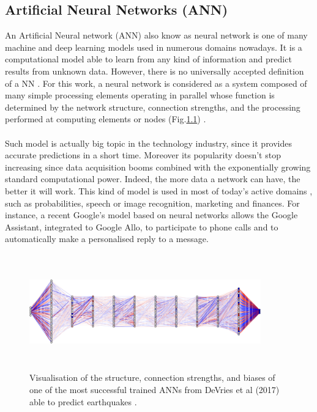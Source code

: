 \documentclass[11pt, a4paper, English]{report}
\begin{document}
\begin{appendix}
\color{blue!40!black}\chapter{Artificial Neural Networks (ANN)}\color{black}
An Artificial Neural network (ANN) also know as neural network is one of many machine and deep learning models used in numerous domains nowadays. It is a computational model able to learn from any kind of information and predict results from unknown data. However, there is no universally accepted definition of a NN \cite{ANNfaq}. For this work, a neural network is considered as a system composed of many simple processing elements operating in
parallel whose function is determined by the network structure, connection strengths, and the
processing performed at computing elements or nodes (Fig.\ref{fig1}) \cite{defANN}.   \\\\
Such model is actually big topic in the technology industry, since it provides accurate predictions in a short time.
Moreover its popularity doesn't stop increasing since data acquisition booms combined with the exponentially growing standard computational power. Indeed, the more data a network can have, the better it will work. This kind of model is used in most of today's active domains \cite{ANNfaq}, such as probabilities, speech or image recognition, marketing and finances. For instance, a recent Google's model based on neural networks allows the Google Assistant, integrated to Google Allo, to participate to phone calls and to automatically make a personalised reply to a message\cite{GoogleAssistant}.
\begin{figure}[h!]
    \centering
    \includegraphics[width=10cm, height=5cm]{nn.png}
    \caption{Visualisation of the structure, connection strengths, and biases of one of the most successful trained ANNs from DeVries et al (2017) able to predict earthquakes \cite{exemple}.}
    \label{fig1}
\end{figure}\\

\end{appendix}
\end{document}
